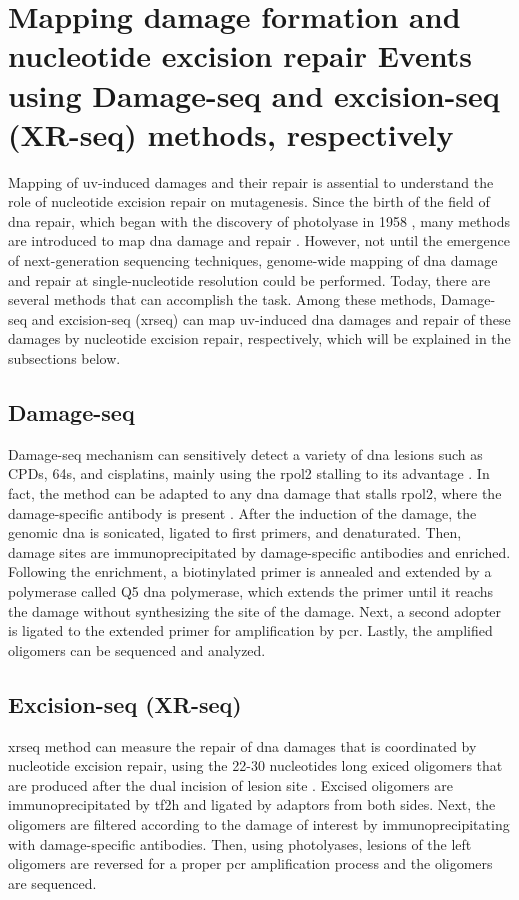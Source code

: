 \section{Mapping damage formation and nucleotide excision repair Events using Damage-seq and excision-seq (XR-seq) methods, respectively}

Mapping of \gls{uv}-induced damages and their repair is assential to understand the role of nucleotide excision repair on mutagenesis. Since the birth of the field of \gls{dna} repair, which began with the discovery of photolyase in 1958 \citep{rupert1958photoreactivation,sancar2016mechanisms}, many methods are introduced to map \gls{dna} damage and repair \citep{li2020methodologies}. However, not until the emergence of next-generation sequencing techniques, genome-wide mapping of \gls{dna} damage and repair at single-nucleotide resolution could be performed. Today, there are several methods that can accomplish the task. Among these methods, Damage-seq and excision-seq (\gls{xrseq}) can map \gls{uv}-induced \gls{dna} damages and repair of these damages by nucleotide excision repair, respectively, which will be explained in the subsections below.

\subsection{Damage-seq}

Damage-seq mechanism can sensitively detect a variety of \gls{dna} lesions such as \gls{CPD}s, \gls{64}s, and  cisplatins, mainly using the \gls{rpol2} stalling to its advantage \citep{hu2016cisplatin}. In fact, the method can be adapted to any \gls{dna} damage that stalls \gls{rpol2}, where the damage-specific antibody is present \citep{sancar2016mechanisms}. After the induction of the damage, the genomic \gls{dna} is sonicated, ligated to first primers, and denaturated. Then, damage sites are immunoprecipitated by damage-specific antibodies and enriched. Following the enrichment, a biotinylated primer is annealed and extended by a polymerase called Q5 \gls{dna} polymerase, which extends the primer until it reachs the damage without synthesizing the site of the damage. Next, a second adopter is ligated to the extended primer for amplification by \gls{pcr}. Lastly, the amplified oligomers can be sequenced and analyzed.      

\subsection{Excision-seq (XR-seq)}

\gls{xrseq} method can measure the repair of \gls{dna} damages that is coordinated by nucleotide excision repair, using the 22-30 nucleotides long exiced oligomers that are produced after the dual incision of lesion site \citep{hu2019genome,hu2016cisplatin}. Excised oligomers are immunoprecipitated by \gls{tf2h} and ligated by adaptors from both sides. Next, the oligomers are filtered according to the damage of interest by immunoprecipitating with damage-specific antibodies. Then, using photolyases, lesions of the left oligomers are reversed for a proper \gls{pcr} amplification process and the oligomers are sequenced.